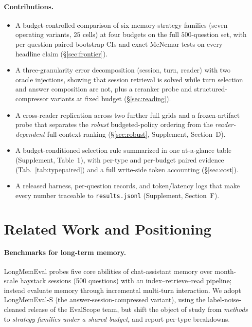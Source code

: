 \documentclass{article} %
\begin{document}
\paragraph{Contributions.}
\begin{itemize}\setlength{\itemsep}{1pt}
\item A budget-controlled comparison of six memory-strategy families (seven operating
variants, $25$ cells) at four budgets on the full
$500$-question set, with per-question paired bootstrap CIs and exact McNemar tests on
every headline claim (\S\ref{sec:frontier}).
\item A three-granularity error decomposition (session, turn, reader) with two oracle
injections, showing that session retrieval is solved while turn selection and answer
composition are not, plus a reranker probe and structured-compressor variants at fixed
budget (\S\ref{sec:reading}).
\item A cross-reader replication across two further full grids and a frozen-artifact probe
that separates the \emph{robust} budgeted-policy ordering from the \emph{reader-dependent}
full-context ranking (\S\ref{sec:robust}, Supplement, Section~D).
\item A budget-conditioned selection rule summarized in one at-a-glance table
(Supplement, Table~1), with per-type and per-budget paired evidence
(Tab.~\ref{tab:typepaired}) and a full write-side token accounting
(\S\ref{sec:cost}).
\item A released harness, per-question records, and token/latency logs that make every
number traceable to \texttt{results.jsonl} (Supplement, Section~F).
\end{itemize}

\section{Related Work and Positioning}
\label{sec:related}
\paragraph{Benchmarks for long-term memory.} LongMemEval \citep{wu2024longmemeval}
probes five core abilities of chat-assistant memory over month-scale haystack sessions
(500 questions) with an index--retrieve--read pipeline; \citet{hu2025memoryagentbench}
instead evaluate memory through incremental multi-turn interaction. We adopt
LongMemEval-S (the answer-session-compressed variant), using the label-noise-cleaned
release of the EvalScope team, but shift the object of study from \emph{methods} to
\emph{strategy families under a shared budget}, and report per-type breakdowns.
\end{document}
